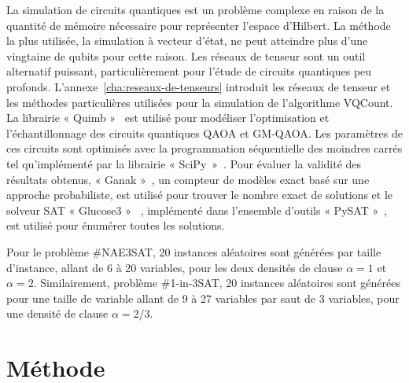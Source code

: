 La simulation de circuits quantiques est un problème complexe en raison de la quantité de mémoire nécessaire pour représenter l'espace d'Hilbert. La méthode la plus utilisée, la simulation à vecteur d'état, ne peut atteindre plus d'une vingtaine de qubits pour cette raison. Les réseaux de tenseur sont un outil alternatif puissant, particulièrement pour l'étude de circuits quantiques peu profonds. L'annexe~\ref{cha:reseaux-de-tenseurs} introduit les réseaux de tenseur et les méthodes particulières utilisées pour la simulation de l'algorithme VQCount. La librairie « Quimb »~\cite{grayQuimbPythonPackage2018} est utilisé pour modéliser l'optimisation et l'échantillonnage des circuits quantiques QAOA et GM-QAOA. Les paramètres de ces circuits sont optimisés avec la programmation séquentielle des moindres carrés tel qu'implémenté par la librairie « SciPy »~\cite{virtanenSciPy10Fundamental2020}. Pour évaluer la validité des résultats obtenus, « Ganak »~\cite{sharmaGANAKScalableProbabilistic2019}, un compteur de modèles exact basé sur une approche probabiliste, est utilisé pour trouver le nombre exact de solutions et le solveur SAT « Glucose3 »~\cite{eenExtensibleSATsolver2004,audemardPredictingLearntClauses2009} , implémenté dans l'ensemble d'outils « PySAT »~\cite{ignatievPySATPythonToolkit2018}, est utilisé pour énumérer toutes les solutions.

Pour le problème \#NAE3SAT, 20 instances aléatoires sont générées par taille d'instance, allant de 6 à 20 variables, pour les deux densités de clause $\alpha=1$ et $\alpha = 2$. Similairement, problème \#1-in-3SAT, 20 instances aléatoires sont générées pour une taille de variable allant de 9 à 27 variables par saut de 3 variables, pour une densité de clause $\alpha = 2/3$. 


\section{Méthode}

